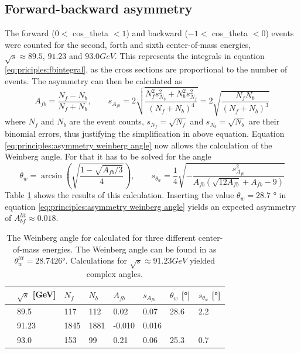\subsection{Forward-backward asymmetry}
The forward ($0<$ cos\_theta $<1$) and backward ($-1<$ cos\_theta $<0$) events were counted for the second, forth and sixth center-of-mass energies, $\sqrt{s}\approx89.5\text{, }91.23$ and $\unit{93.0}{GeV}$. This represents the integrals in equation \ref{eq:priciples:fbintegral}, as the cross sections are proportional to the number of events. The asymmetry can then be calculated as
\begin{equation}
A_{fb}=\frac{N_f-N_b}{N_f+N_b},\qquad s_{A_{fb}}=2\sqrt{\frac{N_f^2s_{N_b}^2+N_b^2s_{N_f}^2}{(N_f+N_b)^4}}=2\sqrt{\frac{N_fN_b}{(N_f+N_b)^3}}
\end{equation}
where $N_f$ and $N_b$ are the event counts, $s_{N_f}=\sqrt{N_f}$ and $s_{N_b}=\sqrt{N_b}$ are their binomial errors, thus justifying the simplification in above equation. 
Equation \ref{eq:principles:asymmetry weinberg angle} now allows the calculation of the Weinberg angle. For that it has to be solved for the angle
\begin{equation}
\theta_w=\arcsin(\sqrt{\frac{1-\sqrt{A_{fb}/3}}{4}}),\qquad s_{\theta_w}=\frac{1}{4}\sqrt{-\frac{s_{A_{fb}}^2}{A_{fb}(\sqrt{12A_{fb}}+A_{fb}-9)}}
\end{equation}
Table \ref{tb:weinbergangle} shows the results of this calculation. Inserting the value $\theta_w=28.7$ ° \cite{Grif} in equation \ref{eq:principles:asymmetry weinberg angle} yields an expected asymmetry of $A_{bf}^{lit}\approx0.018$.\\
\begin{table}[h]\centering
	\begin{tabular}{@{}llllllll@{}}
		\toprule
		&$\sqrt{s}$ [GeV]&$N_f$&$N_b$&$A_{fb}$&$s_{A_{fb}}$&$\theta_w$ [°]&$s_{\theta_w}$ [°]\\
		\midrule
		&89.5&117&112&0.02&0.07&28.6&2.2\\
		&91.23&1845&1881&-0.010&0.016&&\\
		&93.0&153&99&0.21&0.06&25.3&0.7\\
		\bottomrule
	\end{tabular}
	\caption[A\_{fb} and the Weinberg angle]{The Weinberg angle for calculated for three different center-of-mass energies. The Weinberg angle can be found in \cite{muenchen} as $\theta_w^{lit}=28.7426$°. Calculations for $\sqrt{s}\approx\unit{91.23}{GeV}$ yielded complex angles.}
	\label{tb:weinbergangle}
\end{table}
